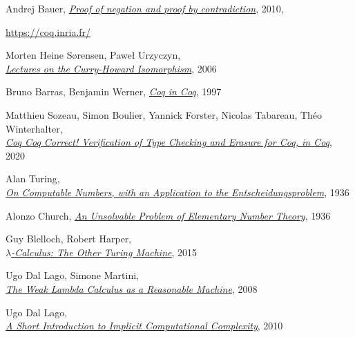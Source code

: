 \documentclass[declaration,mgr,english,shortabstract]{iithesis}
\begin{document}
\begin{thebibliography}{1}
    Andrej Bauer,
    \href{http://math.andrej.com/2010/03/29/proof-of-negation-and-proof-by-contradiction/}{\textit{Proof of negation and proof by contradiction}}, 2010, \\

    \url{https://coq.inria.fr/}

    Morten Heine Sørensen, Paweł Urzyczyn, \\
    \href{http://disi.unitn.it/~bernardi/RSISE11/Papers/curry-howard.pdf}{\textit{Lectures on the Curry-Howard Isomorphism}}, 2006

    Bruno Barras, Benjamin Werner,
    \href{http://www.lix.polytechnique.fr/Labo/Bruno.Barras/publi/coqincoq.pdf}{\textit{Coq in Coq}}, 1997

    Matthieu Sozeau, Simon Boulier, Yannick Forster, Nicolas Tabareau, Théo Winterhalter, \\
    \href{https://www.irif.fr/~sozeau/research/publications/drafts/Coq_Coq_Correct.pdf}{\textit{Coq Coq Correct! Verification of Type Checking and Erasure for Coq, in Coq}}, 2020

    Alan Turing, \\
    \href{https://www.cs.virginia.edu/~robins/Turing_Paper_1936.pdf}{\textit{On Computable Numbers, with an Application to the Entscheidungsproblem}}, 1936

    Alonzo Church,
    \href{https://www.ics.uci.edu/~lopes/teaching/inf212W12/readings/church.pdf}{\textit{An Unsolvable Problem of Elementary Number Theory}}, 1936

    Guy Blelloch, Robert Harper, \\
    \href{https://www.cs.cmu.edu/~rwh/papers/lctotm/cs50.pdf}{\textit{$\lambda$-Calculus: The Other Turing Machine}}, 2015

    Ugo Dal Lago, Simone Martini, \\
    \href{https://www.di.unito.it/~deligu/CDR60_TCS/Martini.pdf}{\textit{The Weak Lambda Calculus as a Reasonable Machine}}, 2008

    Ugo Dal Lago, \\
    \href{http://cs.unibo.it/~dallago/FICQRA/esslli.pdf}{\textit{A Short Introduction to Implicit Computational Complexity}}, 2010


\end{thebibliography}
\end{document}
